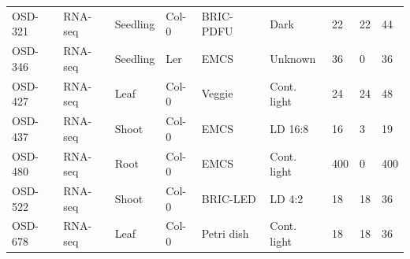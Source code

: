\documentclass[11pt,a4paper]{article}
\begin{document}
\begin{table}[htbp]
\begin{tabular}{lllllllll}
OSD-321 & RNA-seq & Seedling & Col-0 & BRIC-PDFU & Dark & 22 & 22 & 44 \\
OSD-346 & RNA-seq & Seedling & Ler & EMCS & Unknown & 36 & 0 & 36 \\
OSD-427 & RNA-seq & Leaf & Col-0 & Veggie & Cont. light & 24 & 24 & 48 \\
OSD-437 & RNA-seq & Shoot & Col-0 & EMCS & LD 16:8 & 16 & 3 & 19 \\
OSD-480 & RNA-seq & Root & Col-0 & EMCS & Cont. light & 400 & 0 & 400 \\
OSD-522 & RNA-seq & Shoot & Col-0 & BRIC-LED & LD 4:2 & 18 & 18 & 36 \\
OSD-678 & RNA-seq & Leaf & Col-0 & Petri dish & Cont. light & 18 & 18 & 36 \\
\bottomrule
\end{tabular}
\end{table}
\end{document}
